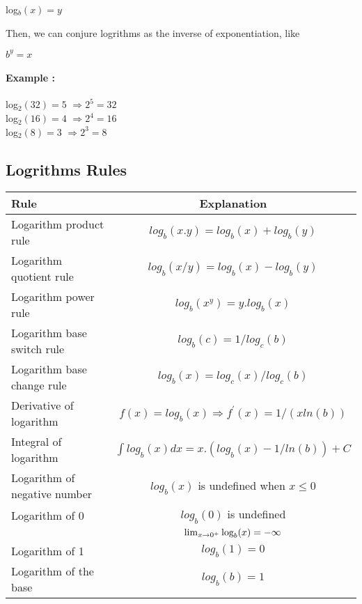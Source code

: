 \documentclass[12pt]{article}
\begin{document}
\begin{center} 	log$_{b}(x) = y$	\end{center}

Then, we can conjure logrithms as the inverse of exponentiation, like
\begin{center}	$b^{y} = x $		\end{center}
\paragraph{Example :\\}
\begin{center}
log$_{2}(32) = 5$	$\Rightarrow 2^{5} = 32 $
\\log$_{2}(16) = 4$ $\Rightarrow 2^{4} = 16 $
\\log$_{2}(8) = 3$ $\Rightarrow 2^{3} = 8 $
\end{center}

\subsection{Logrithms Rules}
\begin{tabular}{| l | c | }
	\hline	
		\textbf{Rule} & \textbf{Explanation} \\
		\hline
		\hline
		Logarithm product rule 		& $log_{b}(x . y) = log_{b}(x) + log_{b}(y)$ \\ \hline
		Logarithm quotient rule 		& $log_{b}(x / y) = log_{b}(x) - log_{b}(y)$ \\ \hline
		Logarithm power rule			& $log_{b}(x ^{y}) = y . log_{b}(x)$  \\ \hline
		Logarithm base switch rule 	& $log_{b}(c) = 1 / log_{c}(b)$	\\ \hline
		Logarithm base change rule 	& $log_{b}(x) = log_{c}(x) / log_{c}(b)$	\\ \hline
		Derivative of logarithm		& $f(x) = log_{b}(x) \Rightarrow f^{'}(x) = 1 / ( x ln(b))$ \\ \hline
		Integral of logarithm		& $\int log_{b}(x) dx = x . ( log_{b}(x) - 1 / ln(b) ) + C$  \\ \hline
		Logarithm of negative number & $log_{b}(x)$ is undefined when $x \le 0$   \\ \hline
		Logarithm of 0				& $log_{b}(0)$ is undefined \\ & $\lim_{x\to 0^+}\textup{log}_b(x)=-\infty$   \\ \hline
		Logarithm of 1				& $log_{b}(1) = 0$  \\ \hline
		Logarithm of the base		& $log_{b}(b) = 1$  \\ \hline
\end{tabular}
\end{document}
